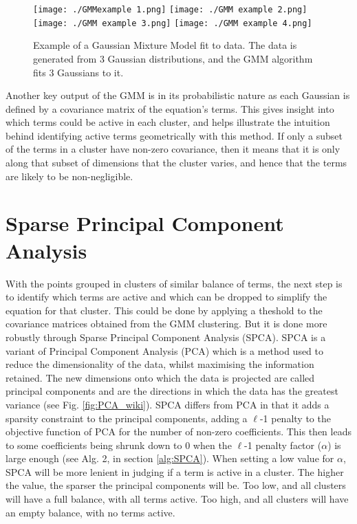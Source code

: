 \documentclass[12pt]{report} %
\begin{document}
\begin{figure}[htbp]
  \centering
  \texttt{[image: ./GMMexample 1.png]}
  \texttt{[image: ./GMM example 2.png]}
  \texttt{[image: ./GMM example 3.png]}
  \texttt{[image: ./GMM example 4.png]}
  \caption{Example of a Gaussian Mixture Model fit to data. The data is generated from 3 Gaussian distributions, and the GMM algorithm fits 3 Gaussians to it. \cite[1D Example Notebook]{gmm_towardsdatascience}}
  \label{fig:GMM_example}
\end{figure}

\vspace{5mm}

Another key output of the GMM is in its probabilistic nature as each Gaussian is defined by a covariance matrix of the equation's terms. This gives insight into which terms could be active in each cluster, and helps illustrate the intuition behind identifying active terms geometrically with this method. If only a subset of the terms in a cluster have non-zero covariance, then it means that it is only along that subset of dimensions that the cluster varies, and hence that the terms are likely to be non-negligible.

\section{Sparse Principal Component Analysis}

With the points grouped in clusters of similar balance of terms, the next step is to identify which terms are active and which can be dropped to simplify the equation for that cluster. This could be done by applying a theshold to the covariance matrices obtained from the GMM clustering. But it is done more robustly through Sparse Principal Component Analysis (SPCA). SPCA is a variant of Principal Component Analysis (PCA) which is a method used to reduce the dimensionality of the data, whilst maximising the information retained. The new dimensions onto which the data is projected are called principal components and are the directions in which the data has the greatest variance\cite{lever2017principal} (see Fig. \ref{fig:PCA_wiki}). SPCA differs from PCA in that it adds a sparsity constraint to the principal components, adding a $\ell$-1 penalty to the objective function of PCA for the number of non-zero coefficients. This then leads to some coefficients being shrunk down to 0 when the $\ell$-1 penalty factor ($\alpha$) is large enough\cite{zou2006sparse} (see Alg. 2, in section \ref{alg:SPCA}). When setting a low value for $\alpha$, SPCA will be more lenient in judging if a term is active in a cluster. The higher the value, the sparser the principal components will be. Too low, and all clusters will have a full balance, with all terms active. Too high, and all clusters will have an empty balance, with no terms active.
\end{document}
